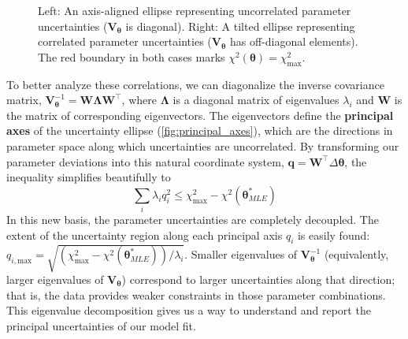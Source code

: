 \begin{figure}[h!]
    \caption{Left: An axis-aligned ellipse representing uncorrelated parameter uncertainties ($\mathbf{V}_{\boldsymbol{\theta}}$ is diagonal). Right: A tilted ellipse representing correlated parameter uncertainties ($\mathbf{V}_{\boldsymbol{\theta}}$ has off-diagonal elements). The red boundary in both cases marks $\chi^2(\boldsymbol{\theta}) = \chi^2_{\text{max}}$.}
    \label{fig:corr_uncorr}
\end{figure}

To better analyze these correlations, we can diagonalize the inverse covariance matrix, $\mathbf{V}_{\boldsymbol{\theta}}^{-1} = \mathbf{W}\mathbf{\Lambda}\mathbf{W}^\top$, where $\mathbf{\Lambda}$ is a diagonal matrix of eigenvalues $\lambda_i$ and $\mathbf{W}$ is the matrix of corresponding eigenvectors. The eigenvectors define the \textbf{principal axes} of the uncertainty ellipse (\autoref{fig:principal_axes}), which are the directions in parameter space along which uncertainties are uncorrelated. By transforming our parameter deviations into this natural coordinate system, $\mathbf{q} = \mathbf{W}^\top \Delta\boldsymbol{\theta}$, the inequality simplifies beautifully to
\begin{equation}
    \sum_i \lambda_i q_i^2 \leq \chi^2_{\text{max}} - \chi^2(\boldsymbol{\theta}^*_{MLE})
\end{equation}
In this new basis, the parameter uncertainties are completely decoupled. The extent of the uncertainty region along each principal axis $q_i$ is easily found: $q_{i, \text{max}} = \sqrt{(\chi^2_{\text{max}} - \chi^2(\boldsymbol{\theta}^*_{MLE}))/\lambda_i}$. Smaller eigenvalues of $\mathbf{V}_{\boldsymbol{\theta}}^{-1}$ (equivalently, larger eigenvalues of $\mathbf{V}_{\boldsymbol{\theta}}$) correspond to larger uncertainties along that direction; that is, the data provides weaker constraints in those parameter combinations. This eigenvalue decomposition gives us a way to understand and report the principal uncertainties of our model fit.

